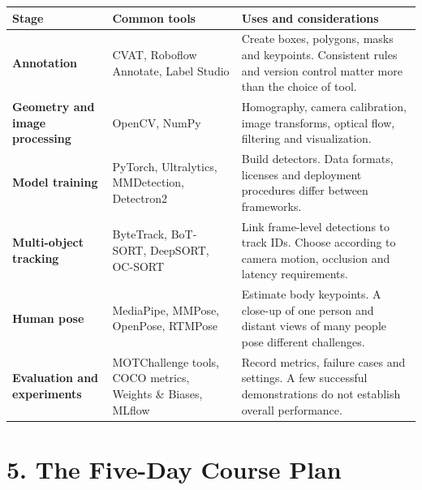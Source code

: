 \documentclass[11pt,a4paper,oneside]{report}
\begin{document}
\begin{toolBox}
\begin{tabularx}{\textwidth}{>{\bfseries\color{Ink}}p{2.7cm} Y Y}
\toprule
Stage & Common tools & Uses and considerations \\
\midrule
Annotation & CVAT, Roboflow Annotate, Label Studio & Create boxes, polygons, masks and keypoints. Consistent rules and version control matter more than the choice of tool.\\
Geometry and image processing & OpenCV, NumPy & Homography, camera calibration, image transforms, optical flow, filtering and visualization.\\
Model training & PyTorch, Ultralytics, MMDetection, Detectron2 & Build detectors. Data formats, licenses and deployment procedures differ between frameworks.\\
Multi-object tracking & ByteTrack, BoT-SORT, DeepSORT, OC-SORT & Link frame-level detections to track IDs. Choose according to camera motion, occlusion and latency requirements.\\
Human pose & MediaPipe, MMPose, OpenPose, RTMPose & Estimate body keypoints. A close-up of one person and distant views of many people pose different challenges.\\
Evaluation and experiments & MOTChallenge tools, COCO metrics, Weights \& Biases, MLflow & Record metrics, failure cases and settings. A few successful demonstrations do not establish overall performance.\\
\bottomrule
\end{tabularx}
\end{toolBox}

\clearpage
\section*{5. The Five-Day Course Plan}
\end{document}

